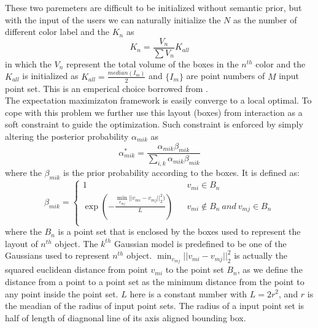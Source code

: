 These two paremeters are difficult to be initialized without semantic prior, but with the input of the users we can naturally initialize the $N$ as the number of different color label and the ${K_n}$ as 
\begin{equation}
\label{equ:K_n}
K_n=\frac{V_n}{\sum V_n}K_{all}
\end{equation}
in which the $V_n$ represent the total volume of the boxes in the $n^{th}$ color and the $K_{all}$ is initialized as $K_{all}=\frac{median(I_m)}{2}$ and $\{I_m\}$ are point numbers of $M$ input point set. This is an emperical choice borrowed from \cite{Evangelidis2014}.\\
The expectation maximizaton framework is easily converge to a local optimal. To cope with this problem we further use this layout (boxes) from interaction as a soft constraint to guide the optimization. Such constraint is enforced by simply altering the posterior probability $\alpha_{mik}$ as\\
\begin{equation}
\label{equ:alteralpha}
\alpha_{mik}^*=\frac{\alpha_{mik}\beta_{mik}}{\sum_{i,k}\alpha_{mik}\beta_{mik}}
\end{equation}
where the $\beta_{mik}$ is the prior probability according to the boxes. It is defined as:\\
\begin{equation}
\beta_{mik}=\left\{
\begin{array}{rcl}
1& &v_{mi} \in B_n\\
\exp(-\frac{\min_{v_{mj}}|| v_{mi} - v_{mj} ||_2^2  )}{L})& &v_{mi} \notin B_n~and~v_{mj} \in B_n\\
\end{array} \right.
\end{equation}
where the $B_n$ is a point set that is enclosed by the boxes used to represent the layout of $n^{th}$ object. The $k^{th}$ Gaussian model is predefined to be one of the Gaussians used to represent $n^{th}$ object. $\min_{v_{mj}}|| v_{mi} - v_{mj} ||_2^2$ is actually the squared euclidean distance from point $v_{mi}$ to the point set $B_n$, as we define the distance from a point to a point set as the minimum distance from the point to any point inside the point set. $L$ here is a constant number with $L=2r^2$, and $r$ is the meadian of the radius of input point sets. The radius of a input point set is half of length of diagnonal line of its axis aligned bounding box.   
